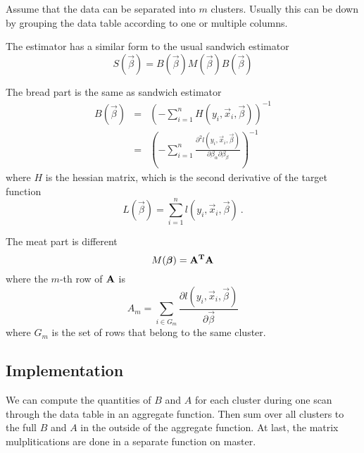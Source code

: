 Assume that the data can be separated into $m$ clusters. Usually this
can be down by grouping the data table according to one or multiple
columns.

The estimator has a similar form to the usual sandwich estimator
\begin{equation}
  S(\vec{\beta}) = B(\vec{\beta}) M(\vec{\beta}) B(\vec{\beta})
\end{equation}

The bread part is the same as sandwich estimator
\begin{eqnarray}
  B(\vec{\beta}) & = & \left(-\sum_{i=1}^{n} H(y_i, \vec{x}_i,
    \vec{\beta})\right)^{-1}\\
  & = & \left(-\sum_{i=1}^{n}\frac{\partial^2 l(y_i, \vec{x}_i,
      \vec{\beta})}{\partial \beta_\alpha \partial \beta_\beta}\right)^{-1}
\end{eqnarray}
where $H$ is the hessian matrix, which is the second derivative of the
target function
\begin{equation}
  L(\vec{\beta}) = \sum_{i=1}^n l(y_i, \vec{x}_i, \vec{\beta})\ .
\end{equation}

The meat part is different
\begin{equation}
  M(\vec{\beta}) = \bf{A}^T\bf{A}
\end{equation}
where the $m$-th row of $\bf{A}$ is
\begin{equation}
  A_m = \sum_{i\in G_m}\frac{\partial
      l(y_i,\vec{x}_i,\vec{\beta})}{\partial \vec{\beta}}
\end{equation}
where $G_m$ is the set of rows that belong to the same cluster.

\subsection{Implementation}

We can compute the quantities of $B$ and $A$ for each cluster during one scan
through the data table in an aggregate function. Then sum over all clusters to
the full $B$ and $A$ in the outside of the aggregate function. At last, the
matrix mulplitications are done in a separate function on master.
